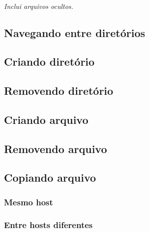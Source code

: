 \documentclass[a4paper,9pt]{extarticle}
\begin{document}
\begin{multicols}{2}
	\paragraph{}
	\paragraph{} \emph{Inclui arquivos ocultos.}
	
	
\subsection{Navegando entre diretórios}

	
\subsection{Criando diretório}


\subsection{Removendo diretório}
\subsection{Criando arquivo}
	
	
\subsection{Removendo arquivo}
\subsection{Copiando arquivo} 
\subsubsection{Mesmo host}
	
	
\subsubsection{Entre hosts diferentes}
	


\end{multicols}
\end{document}
